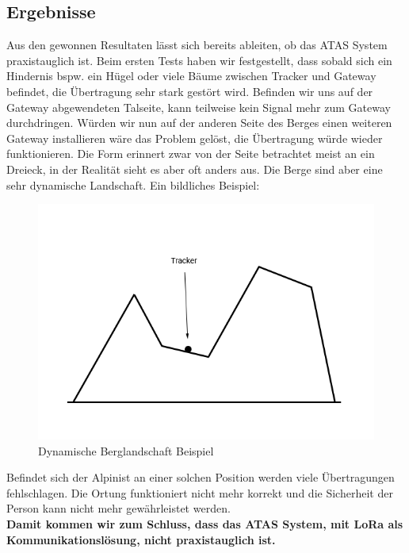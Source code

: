 \documentclass[11pt,english,german]{report}
\theoremstyle{definition}
\begin{document}
\subsection{Ergebnisse}
Aus den gewonnen Resultaten lässt sich bereits ableiten, ob das ATAS System praxistauglich ist. Beim ersten Tests haben wir festgestellt, dass sobald sich ein Hindernis bspw. ein Hügel oder viele Bäume zwischen Tracker und Gateway befindet, die Übertragung sehr stark gestört wird. Befinden wir uns auf der Gateway abgewendeten Talseite, kann teilweise kein Signal mehr zum Gateway durchdringen. Würden wir nun auf der anderen Seite des Berges einen weiteren Gateway installieren wäre das Problem gelöst, die Übertragung würde wieder funktionieren. Die Form erinnert zwar von der Seite betrachtet meist an ein Dreieck, in der Realität sieht es aber oft anders aus. Die Berge sind aber eine sehr dynamische Landschaft. Ein bildliches Beispiel:
\begin{figure}[H]
	\centering
	\includegraphics[width=\textwidth]{img/testing/testing_result.png}
	\caption[Dynamische Berglandschaft Beispiel]
	{Dynamische Berglandschaft Beispiel}
\end{figure}
\noindent
Befindet sich der Alpinist an einer solchen Position werden viele Übertragungen fehlschlagen. Die Ortung funktioniert nicht mehr korrekt und die Sicherheit der Person kann nicht mehr gewährleistet werden. \\[0.3cm]
\textbf{Damit kommen wir zum Schluss, dass das ATAS System, mit LoRa als Kommunikationslösung, nicht praxistauglich ist.}

\end{document}
